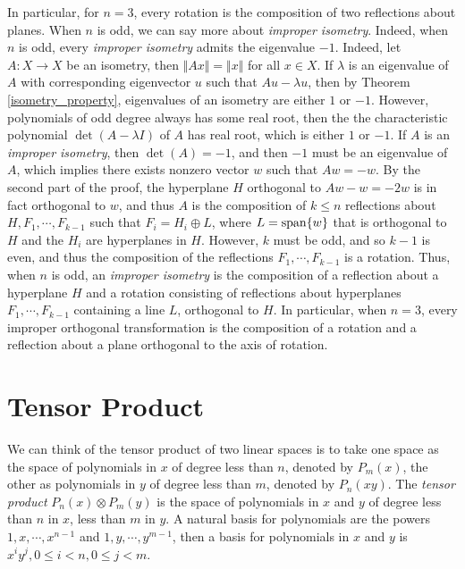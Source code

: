 \documentclass[10pt]{book}
\theoremstyle{definition}
\numberwithin{equation}{chapter}
\begin{document}
\begin{subappendices}
In particular, for $n = 3$, every rotation is the composition of two reflections about planes. When $n$ is odd, we can say more about {\em improper isometry}. Indeed, when $n$ is odd, every {\em improper isometry} admits the eigenvalue $-1$. Indeed, let $A: X \to X$ be an isometry, then $\Vert Ax \Vert = \Vert x \Vert$ for all $x \in X$. If $\lambda$ is an eigenvalue of $A$ with corresponding eigenvector $u$ such that $Au - \lambda u$, then by Theorem \ref{isometry_property}, eigenvalues of an isometry are either $1$ or $-1$. However, polynomials of odd degree always has some real root, then the the characteristic polynomial $\det (A - \lambda I)$ of $A$ has real root, which is either $1$ or $-1$. If $A$ is an {\em improper isometry}, then $\det (A) = -1$, and then $-1$ must be an eigenvalue of $A$, which implies there exists nonzero vector $w$ such that $Aw = - w$. By the second part of the proof, the hyperplane $H$ orthogonal to $Aw - w = -2w$ is in fact orthogonal to $w$, and thus $A$ is the composition of $k \leq n$ reflections about $H, F_1, \cdots, F_{k-1}$ such that $F_i = H_i \oplus L$, where $L = {\rm span}\{w\}$ that is orthogonal to $H$ and the $H_i$ are hyperplanes in $H$. However, $k$ must be odd, and so $k - 1$ is even, and thus the composition of the reflections $F_1, \cdots, F_{k-1}$ is a rotation.  Thus, when $n$ is odd, an {\em improper isometry} is the composition of a reflection about a hyperplane $H$ and a rotation consisting of reflections about hyperplanes $F_1, \cdots, F_{k-1}$ containing a line $L$, orthogonal to $H$. In particular, when $n = 3$, every improper orthogonal transformation is the composition of a rotation and a reflection about a plane orthogonal to the axis of rotation{\bf \cite{35}}.

\medskip

\section{Tensor Product}

We can think of the tensor product of two linear spaces is to take one space as the space of polynomials in $x$ of degree less than $n$, denoted by $P_m(x)$, the other as polynomials in $y$ of degree less than $m$, denoted by $P_n(xy)$. The {\em tensor product} $P_n(x) \otimes P_m(y)$ is the space of polynomials in $x$ and $y$ of degree less than $n$ in $x$, less than $m$ in $y$. A natural basis for polynomials are the powers $1, x, \cdots, x^{n-1}$ and $1, y, \cdots, y^{m-1}$, then a basis for polynomials in $x$ and $y$ is $x^iy^j, 0 \leq i < n, 0 \leq j < m$.


\end{subappendices}
\end{document}
